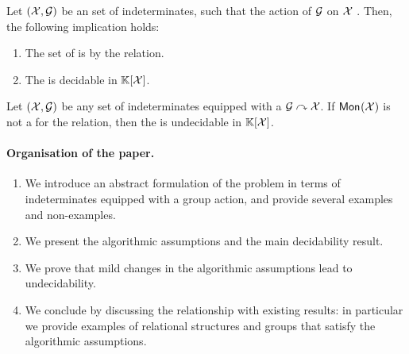 \begin{theorem}
    \label{thm:decid-equiv-idl}
    Let $(\mathcal{X}, \mathcal{G})$ be an  set of indeterminates, such that the 
    action of $\mathcal{G}$ on $\mathcal{X}$ .
    Then, the following implication holds:
    \begin{enumerate}
        \item \label{item:mono-wqo-om1}
            The set of 
            is  by 
            the  relation.
        \item \label{item:decid-equiv-idl}
            The  is decidable in $\mathbb{K}[\mathcal{X}]$.
    \end{enumerate}
\end{theorem}

\begin{conjecture}
    \label{lem:undecid-equiv-idl}
    Let $(\mathcal{X}, \mathcal{G})$ be any 
    set of indeterminates equipped with a  $\mathcal{G} \curvearrowright \mathcal{X}$. If 
    $\mathsf{Mon}_{}(\mathcal{X})$ is not a 
    for the  relation, then the  is undecidable in $\mathbb{K}[\mathcal{X}]$.
\end{conjecture}


\paragraph{Organisation of the paper.}
\begin{enumerate}
    \item We introduce an abstract formulation of the problem 
        in terms of indeterminates equipped with a group action, and
        provide several examples and non-examples.
    \item We present the algorithmic assumptions and the main decidability
        result.
    \item We prove that mild changes in the algorithmic assumptions
        lead to undecidability.
    \item We conclude by discussing the relationship with existing
        results: in particular we provide examples of relational
        structures and groups that satisfy the algorithmic assumptions.
\end{enumerate}
